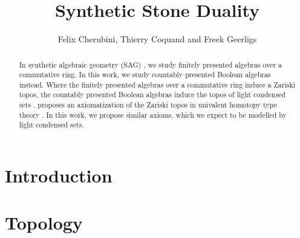 \documentclass{../util/zariski-small}
\title{Synthetic Stone Duality}
\begin{document}
\author{Felix Cherubini, Thierry Coquand and Freek Geerligs}

\maketitle

\begin{abstract}
In synthetic algebraic geometry (SAG) \cite{draft}, we study finitely presented algebras over a commutative ring. 
In this work, we study countably presented Boolean algebras instead. 
Where the finitely presented algebras over a commutative ring induce a Zariski topos, 
the countably presented Boolean algebras induce the topos of light condensed sets \cite{Scholze}. 
\cite{draft} proposes an axiomatization of the Zariski topos in univalent homotopy type theory \cite{hott}. 
In this work, we propose similar axioms, which we expect to be modelled by light condensed sets. 
\end{abstract} 

\section*{Introduction}


\section{Topology}



\printbibliography
\end{document}
